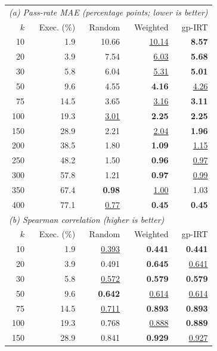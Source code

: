 \begin{table}[t]
  \centering
  \small
  \setlength{\tabcolsep}{3.5pt}
  \begin{tabular}{rrrrr}
    \toprule
    \multicolumn{5}{l}{\textit{(a) Pass-rate MAE (percentage points; lower is better)}} \\
    $k$ & Exec. (\%) & Random & Weighted & gp-IRT \\
    \midrule
    10 & 1.9 & 10.66 & \underline{10.14} & \textbf{8.57} \\
    20 & 3.9 & 7.54 & \underline{6.03} & \textbf{5.68} \\
    30 & 5.8 & 6.04 & \underline{5.31} & \textbf{5.01} \\
    50 & 9.6 & 4.55 & \textbf{4.16} & \underline{4.26} \\
    75 & 14.5 & 3.65 & \underline{3.16} & \textbf{3.11} \\
    100 & 19.3 & \underline{3.01} & \textbf{2.25} & \textbf{2.25} \\
    150 & 28.9 & 2.21 & \underline{2.04} & \textbf{1.96} \\
    200 & 38.5 & 1.80 & \textbf{1.09} & \underline{1.15} \\
    250 & 48.2 & 1.50 & \textbf{0.96} & \underline{0.97} \\
    300 & 57.8 & 1.21 & \textbf{0.97} & \underline{0.99} \\
    350 & 67.4 & \textbf{0.98} & \underline{1.00} & 1.03 \\
    400 & 77.1 & \underline{0.77} & \textbf{0.45} & \textbf{0.45} \\
    \midrule
    \multicolumn{5}{l}{\textit{(b) Spearman correlation (higher is better)}} \\
    $k$ & Exec. (\%) & Random & Weighted & gp-IRT \\
    \midrule
    10 & 1.9 & \underline{0.393} & \textbf{0.441} & \textbf{0.441} \\
    20 & 3.9 & 0.491 & \textbf{0.645} & \underline{0.641} \\
    30 & 5.8 & \underline{0.572} & \textbf{0.579} & \textbf{0.579} \\
    50 & 9.6 & \textbf{0.642} & \underline{0.614} & \underline{0.614} \\
    75 & 14.5 & \underline{0.711} & \textbf{0.893} & \textbf{0.893} \\
    100 & 19.3 & 0.768 & \underline{0.888} & \textbf{0.889} \\
    150 & 28.9 & 0.841 & \textbf{0.929} & \underline{0.927} \\

\end{tabular}
\end{table}
